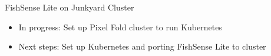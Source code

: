 




\begin{frame}{FishSense Lite on Junkyard Cluster}
    \begin{itemize}
        \item In progress: Set up Pixel Fold cluster to run Kubernetes
        \item Next steps: Set up Kubernetes and porting FishSense Lite to cluster
    \end{itemize}    
\end{frame}

